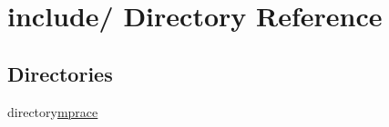 \hypertarget{dir_000000}{
\section{include/ Directory Reference}
\label{dir_000000}
}
\subsection*{Directories}
\begin{CompactItemize}
\item 
directory\hyperlink{dir_000001}{mprace}
\end{CompactItemize}
